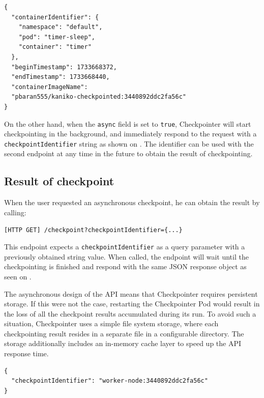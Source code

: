 \documentclass[
  digital,     %
  oneside,     %
  nosansbold,  %
  nocolorbold, %
  lof,         %
  nolot,         %
]{fithesis4}
\newenvironment{code}{\captionsetup{type=listing}}{}
\begin{document}
\begin{code}
\label{lst:checkpoint:response}
\begin{verbatim}
{
  "containerIdentifier": {
    "namespace": "default",
    "pod": "timer-sleep",
    "container": "timer"
  },
  "beginTimestamp": 1733668372,
  "endTimestamp": 1733668440,
  "containerImageName":
  "pbaran555/kaniko-checkpointed:3440892ddc2fa56c"
}
\end{verbatim}
\end{code}

On the other hand, when the \texttt{async} field is set to \texttt{true}, Checkpointer will start checkpointing in the background, and immediately respond to the request with a \texttt{checkpointIdentifier} string as shown on . The identifier can be used with the second endpoint at any time in the future to obtain the result of checkpointing.


\subsection{Result of checkpoint}
When the user requested an asynchronous checkpoint, he can obtain the result by calling:
\begin{description}
  \item \texttt{[HTTP GET] /checkpoint?checkpointIdentifier=\{...\}}
\end{description}
This endpoint expects a \texttt{checkpointIdentifier} as a query parameter with a previously obtained string value. When called, the endpoint will wait until the checkpointing is finished and respond with the same JSON response object as seen on .


The asynchronous design of the API means that Checkpointer requires persistent storage. If this were not the case, restarting the Checkpointer Pod would result in the loss of all the checkpoint results accumulated during its run. To avoid such a situation, Checkpointer uses a simple file system storage, where each checkpointing result resides in a separate file in a configurable directory. The storage additionally includes an in-memory cache layer to speed up the API response time.

\begin{code}
\label{lst:checkpoint:response:async}
\begin{verbatim}
{
  "checkpointIdentifier": "worker-node:3440892ddc2fa56c"
}
\end{verbatim}
\end{code}
\end{document}
